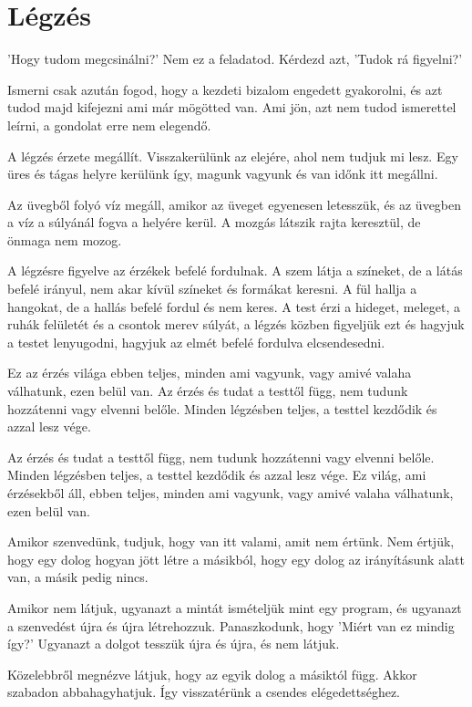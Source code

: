 \hypertarget{luxe9gzuxe9s-1}{%
\chapter{Légzés}\label{luxe9gzuxe9s-1}}

'Hogy tudom megcsinálni?' Nem ez a feladatod. Kérdezd azt, 'Tudok rá
figyelni?'

Ismerni csak azután fogod, hogy a kezdeti bizalom engedett gyakorolni,
és azt tudod majd kifejezni ami már mögötted van. Ami jön, azt nem tudod
ismerettel leírni, a gondolat erre nem elegendő.

A légzés érzete megállít. Visszakerülünk az elejére, ahol nem tudjuk mi
lesz. Egy üres és tágas helyre kerülünk így, magunk vagyunk és van időnk
itt megállni.

Az üvegből folyó víz megáll, amikor az üveget egyenesen letesszük, és az
üvegben a víz a súlyánál fogva a helyére kerül. A mozgás látszik rajta
keresztül, de önmaga nem mozog.

A légzésre figyelve az érzékek befelé fordulnak. A szem látja a
színeket, de a látás befelé irányul, nem akar kívül színeket és formákat
keresni. A fül hallja a hangokat, de a hallás befelé fordul és nem
keres. A test érzi a hideget, meleget, a ruhák felületét és a csontok
merev súlyát, a légzés közben figyeljük ezt és hagyjuk a testet
lenyugodni, hagyjuk az elmét befelé fordulva elcsendesedni.

Ez az érzés világa ebben teljes, minden ami vagyunk, vagy amivé valaha
válhatunk, ezen belül van. Az érzés és tudat a testtől függ, nem tudunk
hozzátenni vagy elvenni belőle. Minden légzésben teljes, a testtel
kezdődik és azzal lesz vége.

Az érzés és tudat a testtől függ, nem tudunk hozzátenni vagy elvenni
belőle. Minden légzésben teljes, a testtel kezdődik és azzal lesz vége.
Ez világ, ami érzésekből áll, ebben teljes, minden ami vagyunk, vagy
amivé valaha válhatunk, ezen belül van.

Amikor szenvedünk, tudjuk, hogy van itt valami, amit nem értünk. Nem
értjük, hogy egy dolog hogyan jött létre a másikból, hogy egy dolog az
irányításunk alatt van, a másik pedig nincs.

Amikor nem látjuk, ugyanazt a mintát ismételjük mint egy program, és
ugyanazt a szenvedést újra és újra létrehozzuk. Panaszkodunk, hogy
'Miért van ez mindig így?' Ugyanazt a dolgot tesszük újra és újra, és
nem látjuk.

Közelebbről megnézve látjuk, hogy az egyik dolog a másiktól függ. Akkor
szabadon abbahagyhatjuk. Így visszatérünk a csendes elégedettséghez.
